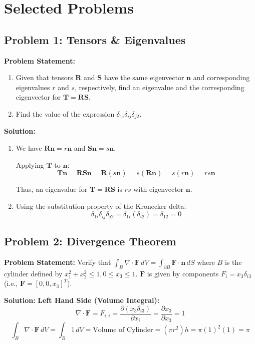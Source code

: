\documentclass[10pt,twocolumn, a4paper]{article}
\begin{document}
\section{Selected Problems}

\subsection{Problem 1: Tensors \& Eigenvalues}
\textbf{Problem Statement:}
\begin{enumerate}
    \item Given that tensors $\mathbf{R}$ and $\mathbf{S}$ have the same eigenvector $\mathbf{n}$ and corresponding eigenvalues $r$ and $s$, respectively, find an eigenvalue and the corresponding eigenvector for $\mathbf{T} = \mathbf{RS}$.
    \item Find the value of the expression $\delta_{1i}\delta_{ij}\delta_{j2}$.
\end{enumerate}

\textbf{Solution:}
\begin{enumerate}
    \item We have $\mathbf{Rn} = r\mathbf{n}$ and $\mathbf{Sn} = s\mathbf{n}$.
    
    Applying $\mathbf{T}$ to $\mathbf{n}$:
    \[ \mathbf{Tn} = \mathbf{RSn} = \mathbf{R}(s\mathbf{n}) = s(\mathbf{Rn}) = s(r\mathbf{n}) = rs\mathbf{n} \]
    
    Thus, an eigenvalue for $\mathbf{T} = \mathbf{RS}$ is $rs$ with eigenvector $\mathbf{n}$.

    \item Using the substitution property of the Kronecker delta:
    \[ \delta_{1i}\delta_{ij}\delta_{j2} = \delta_{1i} (\delta_{i2}) = \delta_{12} = 0 \]
\end{enumerate}

\subsection{Problem 2: Divergence Theorem}
\textbf{Problem Statement:}
Verify that $\int_B \nabla \cdot \mathbf{F} \, dV = \int_{\partial B} \mathbf{F} \cdot \mathbf{n} \, dS$ where $B$ is the cylinder defined by $x_1^2 + x_2^2 \leq 1, 0 \leq x_3 \leq 1$.
$\mathbf{F}$ is given by components $F_i = x_3 \delta_{i3}$ (i.e., $\mathbf{F} = [0, 0, x_3]^T$).

\textbf{Solution:}
\textbf{Left Hand Side (Volume Integral):}
\[ \nabla \cdot \mathbf{F} = F_{i,i} = \frac{\partial (x_3 \delta_{i3})}{\partial x_i} = \frac{\partial x_3}{\partial x_3} = 1 \]
\[ \int_B \nabla \cdot \mathbf{F} \, dV = \int_B 1 \, dV = \text{Volume of Cylinder} = (\pi r^2) h = \pi(1)^2(1) = \pi \]
\end{document}
